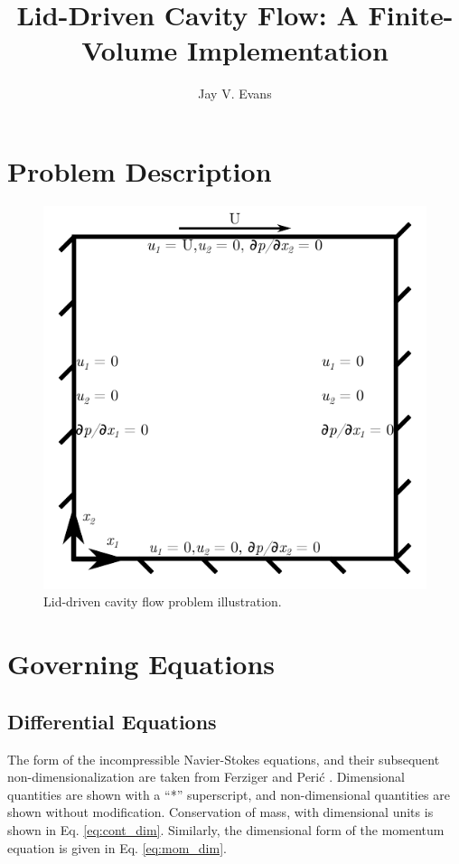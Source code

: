 \documentclass[10pt, letterpaper]{article}
\title{Lid-Driven Cavity Flow: A Finite-Volume Implementation}
\date{}
\author{Jay V. Evans}
\begin{document}
\maketitle

\section{Problem Description}

\begin{figure}[h]
    \centering
    \includegraphics[]{img/problem.pdf}
    \caption{Lid-driven cavity flow problem illustration.}
    \label{fig:problem}
\end{figure}


\section{Governing Equations}

\subsection{Differential Equations}

The form of the incompressible Navier-Stokes equations, and their subsequent non-dimensionalization are taken from Ferziger and Perić \cite{Ferziger_Springer_2002}. Dimensional quantities are shown with a ``*'' superscript, and non-dimensional quantities are shown without modification. Conservation of mass, with dimensional units is shown in Eq. \ref{eq:cont_dim}. Similarly, the dimensional form of the momentum equation is given in Eq. \ref{eq:mom_dim}.
\end{document}
